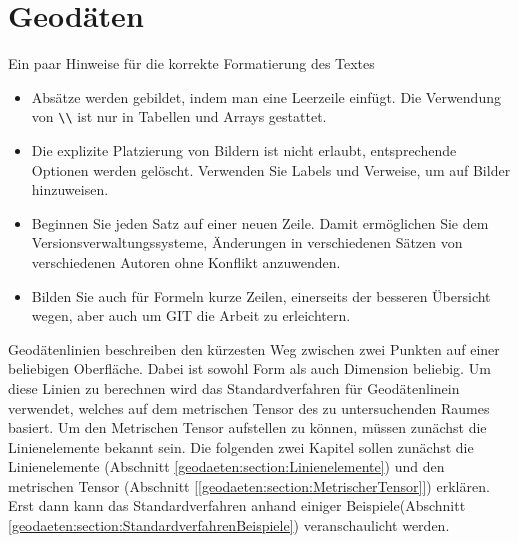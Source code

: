 %
%
%
%
\chapter{Geodäten\label{chapter:geodaeten}}
\begin{refsection}

Ein paar Hinweise für die korrekte Formatierung des Textes
\begin{itemize}
\item
Absätze werden gebildet, indem man eine Leerzeile einfügt.
Die Verwendung von \verb+\\+ ist nur in Tabellen und Arrays gestattet.
\item
Die explizite Platzierung von Bildern ist nicht erlaubt, entsprechende
Optionen werden gelöscht. 
Verwenden Sie Labels und Verweise, um auf Bilder hinzuweisen.
\item
Beginnen Sie jeden Satz auf einer neuen Zeile. 
Damit ermöglichen Sie dem Versionsverwaltungssysteme, Änderungen
in verschiedenen Sätzen von verschiedenen Autoren ohne Konflikt 
anzuwenden.
\item 
Bilden Sie auch für Formeln kurze Zeilen, einerseits der besseren
Übersicht wegen, aber auch um GIT die Arbeit zu erleichtern.
\end{itemize}
Geodätenlinien beschreiben den kürzesten Weg zwischen zwei Punkten auf einer beliebigen Oberfläche.
Dabei ist sowohl Form als auch Dimension beliebig.
Um diese Linien zu berechnen wird das Standardverfahren für Geodätenlinein verwendet, welches auf dem metrischen Tensor des zu untersuchenden Raumes basiert.
Um den Metrischen Tensor aufstellen zu können, müssen zunächst die Linienelemente bekannt sein.
Die folgenden zwei Kapitel sollen zunächst die Linienelemente (Abschnitt \ref{geodaeten:section:Linienelemente}) und den metrischen Tensor (Abschnitt [\ref{geodaeten:section:MetrischerTensor}]) erklären.
Erst dann kann das Standardverfahren anhand einiger Beispiele(Abschnitt \ref{geodaeten:section:StandardverfahrenBeispiele}) veranschaulicht werden.





\printbibliography[heading=subbibliography]
\end{refsection}
